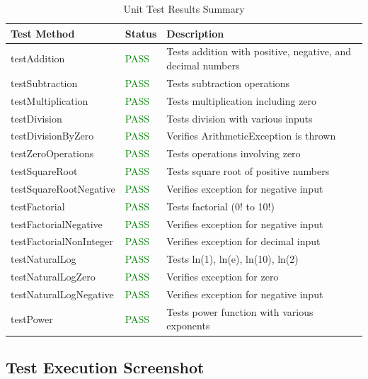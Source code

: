 \documentclass[12pt,a4paper]{article}
\begin{document}
\begin{table}[H]
    \centering
    \begin{tabular}{|l|l|p{6cm}|}
        \hline
        \textbf{Test Method} & \textbf{Status} & \textbf{Description} \\
        \hline
        testAddition & \textcolor{green}{PASS} & Tests addition with positive, negative, and decimal numbers \\
        testSubtraction & \textcolor{green}{PASS} & Tests subtraction operations \\
        testMultiplication & \textcolor{green}{PASS} & Tests multiplication including zero \\
        testDivision & \textcolor{green}{PASS} & Tests division with various inputs \\
        testDivisionByZero & \textcolor{green}{PASS} & Verifies ArithmeticException is thrown \\
        testZeroOperations & \textcolor{green}{PASS} & Tests operations involving zero \\
        testSquareRoot & \textcolor{green}{PASS} & Tests square root of positive numbers \\
        testSquareRootNegative & \textcolor{green}{PASS} & Verifies exception for negative input \\
        testFactorial & \textcolor{green}{PASS} & Tests factorial (0! to 10!) \\
        testFactorialNegative & \textcolor{green}{PASS} & Verifies exception for negative input \\
        testFactorialNonInteger & \textcolor{green}{PASS} & Verifies exception for decimal input \\
        testNaturalLog & \textcolor{green}{PASS} & Tests ln(1), ln(e), ln(10), ln(2) \\
        testNaturalLogZero & \textcolor{green}{PASS} & Verifies exception for zero \\
        testNaturalLogNegative & \textcolor{green}{PASS} & Verifies exception for negative input \\
        testPower & \textcolor{green}{PASS} & Tests power function with various exponents \\
        \hline
    \end{tabular}
    \caption{Unit Test Results Summary}
\end{table}

\subsection{Test Execution Screenshot}
\end{document}
